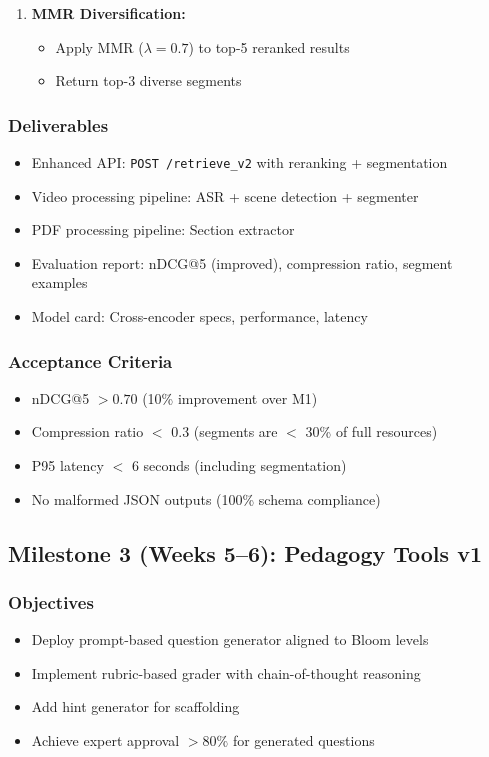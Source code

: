 \documentclass[11pt,letterpaper]{article}
\begin{document}
\begin{enumerate}
\item \textbf{MMR Diversification:}
\begin{itemize}
\item Apply MMR ($\lambda = 0.7$) to top-5 reranked results
\item Return top-3 diverse segments
\end{itemize}
\end{enumerate}

\subsubsection{Deliverables}
\begin{itemize}
\item Enhanced API: \texttt{POST /retrieve\_v2} with reranking + segmentation
\item Video processing pipeline: ASR + scene detection + segmenter
\item PDF processing pipeline: Section extractor
\item Evaluation report: nDCG@5 (improved), compression ratio, segment examples
\item Model card: Cross-encoder specs, performance, latency
\end{itemize}

\subsubsection{Acceptance Criteria}
\begin{itemize}
\item nDCG@5 $> 0.70$ (10\% improvement over M1)
\item Compression ratio $<$ 0.3 (segments are $<$ 30\% of full resources)
\item P95 latency $<$ 6 seconds (including segmentation)
\item No malformed JSON outputs (100\% schema compliance)
\end{itemize}

\subsection{Milestone 3 (Weeks 5--6): Pedagogy Tools v1}\label{subsec:milestone-3}

\subsubsection{Objectives}
\begin{itemize}
\item Deploy prompt-based question generator aligned to Bloom levels
\item Implement rubric-based grader with chain-of-thought reasoning
\item Add hint generator for scaffolding
\item Achieve expert approval $> 80\%$ for generated questions
\end{itemize}
\end{document}
